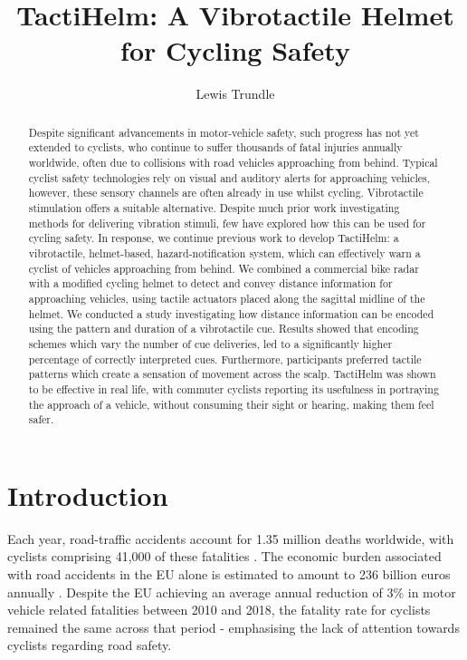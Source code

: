 \documentclass{mpaper}
\begin{document}
\title{TactiHelm: A Vibrotactile Helmet for Cycling Safety}
\author{Lewis Trundle}

\maketitle

\begin{abstract}
Despite significant advancements in motor-vehicle safety, such progress has not yet extended to cyclists, who continue to suffer thousands of fatal injuries annually worldwide, often due to collisions with road vehicles approaching from behind. Typical cyclist safety technologies rely on visual and auditory alerts for approaching vehicles, however, these sensory channels are often already in use whilst cycling. Vibrotactile stimulation offers a suitable alternative. Despite much prior work investigating methods for delivering vibration stimuli, few have explored how this can be used for cycling safety. In response, we continue previous work to develop TactiHelm: a vibrotactile, helmet-based, hazard-notification system, which can effectively warn a cyclist of vehicles approaching from behind. We combined a commercial bike radar with a modified cycling helmet to detect and convey distance information for approaching vehicles, using tactile actuators placed along the sagittal midline of the helmet. We conducted a study investigating how distance information can be encoded using the pattern and duration of a vibrotactile cue. Results showed that encoding schemes which vary the number of cue deliveries, led to a significantly higher percentage of correctly interpreted cues. Furthermore, participants preferred tactile patterns which create a sensation of movement across the scalp. TactiHelm was shown to be effective in real life, with commuter cyclists reporting its usefulness in portraying the approach of a vehicle, without consuming their sight or hearing, making them feel safer.
\end{abstract}

\section{Introduction}
Each year, road-traffic accidents account for 1.35 million deaths worldwide, with cyclists comprising 41,000 of these fatalities \cite{world2018global}. The economic burden associated with road accidents in the EU alone is estimated to amount to 236 billion euros annually \cite{costoftransport}. Despite the EU achieving an average annual reduction of 3\% in motor vehicle related fatalities between 2010 and 2018, the fatality rate for cyclists remained the same across that period \cite{adminaite2020safe} - emphasising the lack of attention towards cyclists regarding road safety.
\end{document}
